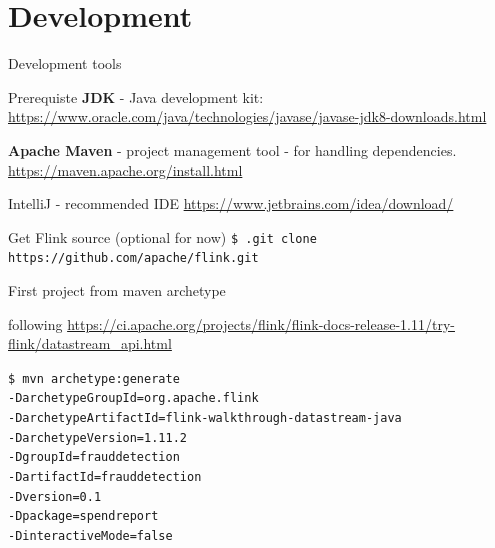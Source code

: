 \documentclass[blue]{beamer}
\begin{document}
\section{Development}
\begin{frame}{Development tools}

\begin{block}{Prerequiste}
\textbf{JDK} - Java development kit: \url{https://www.oracle.com/java/technologies/javase/javase-jdk8-downloads.html}

\textbf{Apache Maven} - project management tool - for handling dependencies. \url{https://maven.apache.org/install.html} 
\end{block}

\begin{block}{IntelliJ - recommended IDE}
\url{https://www.jetbrains.com/idea/download/}

\end{block}

\begin{block}{Get Flink source (optional for now)}
{\tt  \$ .git clone https://github.com/apache/flink.git}
\end{block}
\end{frame}



\begin{frame}{First project from maven archetype}

following \url{https://ci.apache.org/projects/flink/flink-docs-release-1.11/try-flink/datastream_api.html}

{\tt  \$  mvn archetype:generate \ \\
    -DarchetypeGroupId=org.apache.flink \ \\
    -DarchetypeArtifactId=flink-walkthrough-datastream-java \ \\
    -DarchetypeVersion=1.11.2 \ \\
    -DgroupId=frauddetection \ \\
    -DartifactId=frauddetection \ \\
    -Dversion=0.1 \ \\
    -Dpackage=spendreport \ \\
    -DinteractiveMode=false}
\end{frame}
\end{document}
